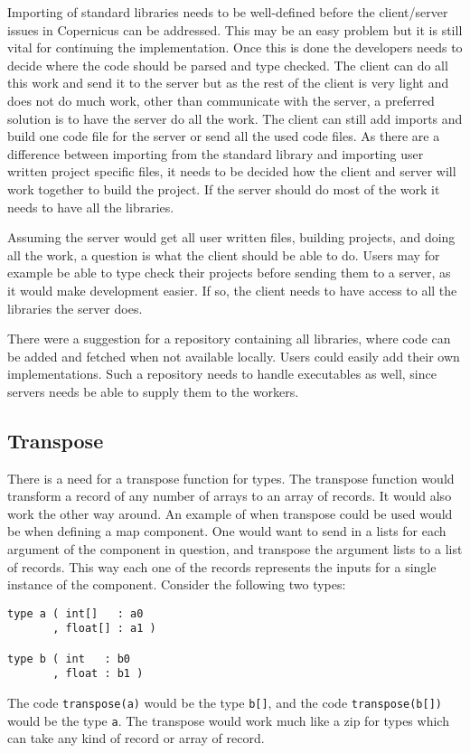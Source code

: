 Importing of standard libraries needs to be well-defined before the
client/server issues in Copernicus can be addressed. This may be an
easy problem but it is still vital for continuing the
implementation. Once this is done the developers needs to decide where
the code should be parsed and type checked. The client can do all this
work and send it to the server but as the rest of the client is very
light and does not do much work, other than communicate with the
server, a preferred solution is to have the server do all the
work. The client can still add imports and build one code file for the
server or send all the used code files. As there are a difference
between importing from the standard library and importing user written
project specific files, it needs to be decided how the client and
server will work together to build the project. If the server should
do most of the work it needs to have all the libraries.

Assuming the server would get all user written files, building
projects, and doing all the work, a question is what the client should
be able to do. Users may for example be able to type check their
projects before sending them to a server, as it would make development
easier. If so, the client needs to have access to all the libraries
the server does.

There were a suggestion for a repository containing all libraries,
where code can be added and fetched when not available locally. Users
could easily add their own implementations. Such a repository needs to
handle executables as well, since servers needs be able to supply them
to the workers.


\subsection{Transpose}\label{sec:transpose}
There is a need for a transpose function for types. The transpose
function would transform a record of any number of arrays to an array
of records. It would also work the other way around. An example of
when transpose could be used would be when defining a map
component. One would want to send in a lists for each argument of the
component in question, and transpose the argument lists to a list of
records. This way each one of the records represents the inputs for a
single instance of the component. Consider the following two types:

\begin{verbatim}
type a ( int[]   : a0
       , float[] : a1 )

type b ( int   : b0
       , float : b1 )
\end{verbatim}

The code \verb#transpose(a)# would be the type \verb#b[]#, and the
code \verb#transpose(b[])# would be the type \verb#a#. The transpose
would work much like a zip for types which can take any kind of record
or array of record.
